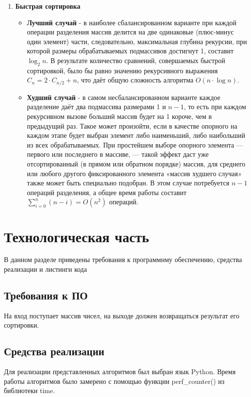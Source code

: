 \documentclass[a4paper,12pt]{report}
\begin{document}
\begin{enumerate}
\item \textbf{Быстрая сортировка}
\begin{itemize}
\item \textbf{Лучший случай} - в наиболее сбалансированном варианте при каждой операции разделения массив делится на две одинаковые (плюс-минус один элемент) части, следовательно, максимальная глубина рекурсии, при которой размеры обрабатываемых подмассивов достигнут 1, составит $\log _{2}n$. В результате количество сравнений, совершаемых быстрой сортировкой, было бы равно значению рекурсивного выражения $C_{n}=2\cdot C_{n/2}+n$, что даёт общую сложность алгоритма $O(n\cdot \log n)$.
\newpage
\item \textbf{Худший случай} - в самом несбалансированном варианте каждое разделение даёт два подмассива размерами 1 и $n-1$, то есть при каждом рекурсивном вызове больший массив будет на 1 короче, чем в предыдущий раз. Такое может произойти, если в качестве опорного на каждом этапе будет выбран элемент либо наименьший, либо наибольший из всех обрабатываемых. При простейшем выборе опорного элемента — первого или последнего в массиве, — такой эффект даст уже отсортированный (в прямом или обратном порядке) массив, для среднего или любого другого фиксированного элемента «массив худшего случая» также может быть специально подобран. В этом случае потребуется $n-1$ операций разделения, а общее время работы составит $\sum _{i=0}^{n}(n-i)=O(n^{2})$ операций.
\end{itemize}
\end{enumerate}
\chapter{Технологическая часть}
\hspace{0.6cm}В данном разделе приведены требования к программнму обеспечению, средства реализации и листинги кода
\section{Требования к ПО}

\hspace{0.6cm}На вход поступает массив чисел, на выходе должен возвращаться результат его сортировки.
	

\section{Средства реализации}
\hspace{0.6cm}Для реализации представленных алгоритмов был выбран язык Python. Время работы алгоритмов было замерено с помощью функции perf\_counter() из библиотеки time.
\end{document}
